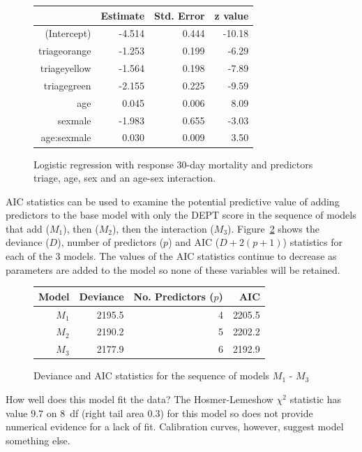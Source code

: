 \begin{figure}[ht]
\centering
\begin{tabular}{rrrr}
  \hline
 & Estimate & Std. Error & z value  \\
  \hline
(Intercept) & -4.514 & 0.444 & -10.18 \\
  triageorange & -1.253 & 0.199 & -6.29  \\
  triageyellow & -1.564 & 0.198 & -7.89  \\
  triagegreen & -2.155 & 0.225 & -9.59  \\
  age & 0.045 & 0.006 & 8.09  \\
  sexmale & -1.983 & 0.655 & -3.03  \\
  age:sexmale & 0.030 & 0.009 & 3.50  \\
   \hline
\end{tabular}
\caption{Logistic regression with response 30-day mortality and
       predictors triage, age, sex and an age-sex interaction.}
\label{figure:triageAgeSexInteractionMort30logreg}
\end{figure}

AIC statistics can be used to examine the potential predictive value of adding predictors to the base model with only the DEPT score in the sequence of models that add   ($M_1$), then  ($M_2$), then the interaction  ($M_3$).  Figure~\ref{DevianceAICDeptAgeSexFullData} shows the deviance ($D$), number of predictors ($p$) and AIC ($D + 2(p+1)$) statistics for each of the 3 models.  The values of the AIC statistics continue to decrease as parameters are added to the model so none of these variables will be retained.  

\begin{figure}[ht]
  \centering
    \begin{tabular}{rrrr}
    \hline
      Model & Deviance & No. Predictors ($p$) & AIC \\
      \hline
      $M_1$ & 2195.5 &  4 & 2205.5 \\
      $M_2$ & 2190.2 &  5 & 2202.2 \\
      $M_3$ & 2177.9 &  6 & 2192.9 \\
      \hline
    \end{tabular}
  \caption{Deviance and AIC statistics for the sequence of models $M_1$ - $M_3$}
  \label{DevianceAICDeptAgeSexFullData}
\end{figure}

How well does this model fit the data?  The Hosmer-Lemeshow $\chi^2$ statistic has value $9.7$ on 8~df (right tail area $0.3$) for this model so does not provide numerical evidence for a lack of fit.  Calibration curves, however, suggest model something else.

